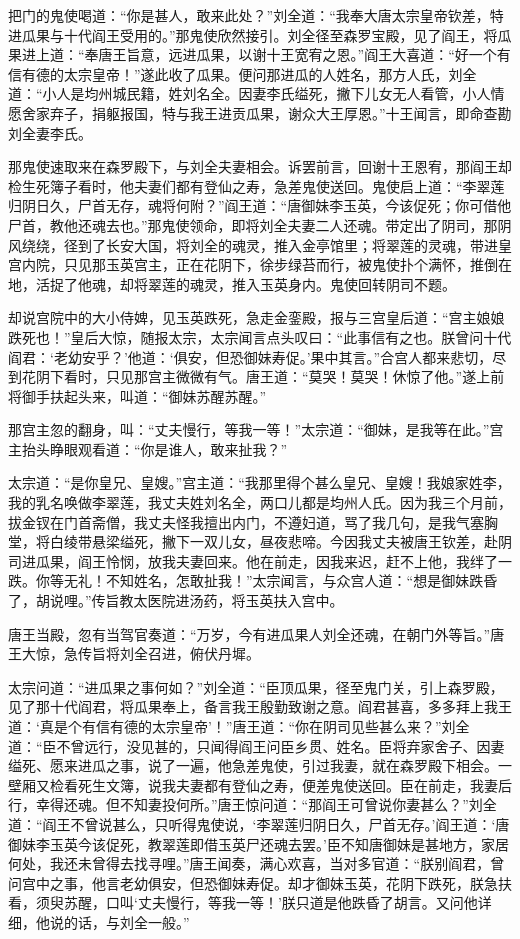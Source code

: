 \documentclass[12pt]{lsbook}
\begin{document}
把门的鬼使喝道：“你是甚人，敢来此处？”刘全道：“我奉大唐太宗皇帝钦差，特进瓜果与十代阎王受用的。”那鬼使欣然接引。刘全径至森罗宝殿，见了阎王，将瓜果进上道：“奉唐王旨意，远进瓜果，以谢十王宽宥之恩。”阎王大喜道：“好一个有信有德的太宗皇帝！”遂此收了瓜果。便问那进瓜的人姓名，那方人氏，刘全道：“小人是均州城民籍，姓刘名全。因妻李氏缢死，撇下儿女无人看管，小人情愿舍家弃子，捐躯报国，特与我王进贡瓜果，谢众大王厚恩。”十王闻言，即命查勘刘全妻李氏。

那鬼使速取来在森罗殿下，与刘全夫妻相会。诉罢前言，回谢十王恩宥，那阎王却检生死簿子看时，他夫妻们都有登仙之寿，急差鬼使送回。鬼使启上道：“李翠莲归阴日久，尸首无存，魂将何附？”阎王道：“唐御妹李玉英，今该促死；你可借他尸首，教他还魂去也。”那鬼使领命，即将刘全夫妻二人还魂。带定出了阴司，那阴风绕绕，径到了长安大国，将刘全的魂灵，推入金亭馆里；将翠莲的灵魂，带进皇宫内院，只见那玉英宫主，正在花阴下，徐步绿苔而行，被鬼使扑个满怀，推倒在地，活捉了他魂，却将翠莲的魂灵，推入玉英身内。鬼使回转阴司不题。

却说宫院中的大小侍婢，见玉英跌死，急走金銮殿，报与三宫皇后道：“宫主娘娘跌死也！”皇后大惊，随报太宗，太宗闻言点头叹曰：“此事信有之也。朕曾问十代阎君：‘老幼安乎？’他道：‘俱安，但恐御妹寿促。’果中其言。”合宫人都来悲切，尽到花阴下看时，只见那宫主微微有气。唐王道：“莫哭！莫哭！休惊了他。”遂上前将御手扶起头来，叫道：“御妹苏醒苏醒。”

那宫主忽的翻身，叫：“丈夫慢行，等我一等！”太宗道：“御妹，是我等在此。”宫主抬头睁眼观看道：“你是谁人，敢来扯我？”

太宗道：“是你皇兄、皇嫂。”宫主道：“我那里得个甚么皇兄、皇嫂！我娘家姓李，我的乳名唤做李翠莲，我丈夫姓刘名全，两口儿都是均州人氏。因为我三个月前，拔金钗在门首斋僧，我丈夫怪我擅出内门，不遵妇道，骂了我几句，是我气塞胸堂，将白绫带悬梁缢死，撇下一双儿女，昼夜悲啼。今因我丈夫被唐王钦差，赴阴司进瓜果，阎王怜悯，放我夫妻回来。他在前走，因我来迟，赶不上他，我绊了一跌。你等无礼！不知姓名，怎敢扯我！”太宗闻言，与众宫人道：“想是御妹跌昏了，胡说哩。”传旨教太医院进汤药，将玉英扶入宫中。

唐王当殿，忽有当驾官奏道：“万岁，今有进瓜果人刘全还魂，在朝门外等旨。”唐王大惊，急传旨将刘全召进，俯伏丹墀。

太宗问道：“进瓜果之事何如？”刘全道：“臣顶瓜果，径至鬼门关，引上森罗殿，见了那十代阎君，将瓜果奉上，备言我王殷勤致谢之意。阎君甚喜，多多拜上我王道：‘真是个有信有德的太宗皇帝’！”唐王道：“你在阴司见些甚么来？”刘全道：“臣不曾远行，没见甚的，只闻得阎王问臣乡贯、姓名。臣将弃家舍子、因妻缢死、愿来进瓜之事，说了一遍，他急差鬼使，引过我妻，就在森罗殿下相会。一壁厢又检看死生文簿，说我夫妻都有登仙之寿，便差鬼使送回。臣在前走，我妻后行，幸得还魂。但不知妻投何所。”唐王惊问道：“那阎王可曾说你妻甚么？”刘全道：“阎王不曾说甚么，只听得鬼使说，‘李翠莲归阴日久，尸首无存。’阎王道：‘唐御妹李玉英今该促死，教翠莲即借玉英尸还魂去罢。’臣不知唐御妹是甚地方，家居何处，我还未曾得去找寻哩。”唐王闻奏，满心欢喜，当对多官道：“朕别阎君，曾问宫中之事，他言老幼俱安，但恐御妹寿促。却才御妹玉英，花阴下跌死，朕急扶看，须臾苏醒，口叫‘丈夫慢行，等我一等！’朕只道是他跌昏了胡言。又问他详细，他说的话，与刘全一般。”
\end{document}
